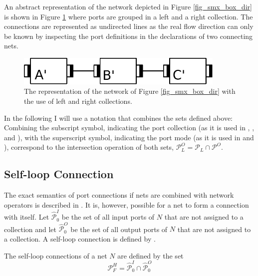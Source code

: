An abstract representation of the network depicted in Figure \ref{fig_smx_box_dir} is shown in Figure \ref{fig_smx_net_dir} where ports are grouped in a left and a right collection.
The connections are represented as undirected lines as the real flow direction can only be known by inspecting the port definitions in the declarations of two connecting nets.
\begin{figure}[bht]
    \centering
    \TopFigSpace
    \includegraphics[width=10cm]{fig/direction_net.pdf}
    \CaptionFigSpace
    \caption{The representation of the network of Figure \ref{fig_smx_box_dir} with the use of left and right collections.}
    \label{fig_smx_net_dir}
    \BotFigSpace
\end{figure}

In the following I will use a notation that combines the sets defined above: Combining the subscript symbol, indicating the port collection (as it is used in \Equ{\ref{eq_smx_port_left}}, \Equ{\ref{eq_smx_port_right}}, and \Equ{\ref{eq_smx_port_side}}), with the superscript symbol, indicating the port mode (as it is used in \Equ{\ref{eq_smx_port_in}} and \Equ{\ref{eq_smx_port_out}}), correspond to the intersection operation of both sets, \eg $\mathcal{P}_L^O = \mathcal{P}_L \cap \mathcal{P}^O$.

\subsection{Self-loop Connection}
\label{sect_smx_nets_self}
The exact semantics of port connections if nets are combined with network operators is described in \Sect{\ref{sect_smx_network}}.
It is, however, possible for a net to form a connection with itself.
Let $\hat{\mathcal{P}}_0^I$ be the set of all input ports of $N$ that are not assigned to a collection and let $\hat{\mathcal{P}}_0^O$ be the set of all output ports of $N$ that are not assigned to a collection.
A self-loop connection is defined by \Def{\ref{def_smx_self}}.

\begin{definition}
    \label{def_smx_self}
    The self-loop connections of a net $N$ are defined by the set
    $$\mathcal{P}_F^H = \hat{\mathcal{P}}_0^{I} \cap \hat{\mathcal{P}}_0^{O}$$
\end{definition}


